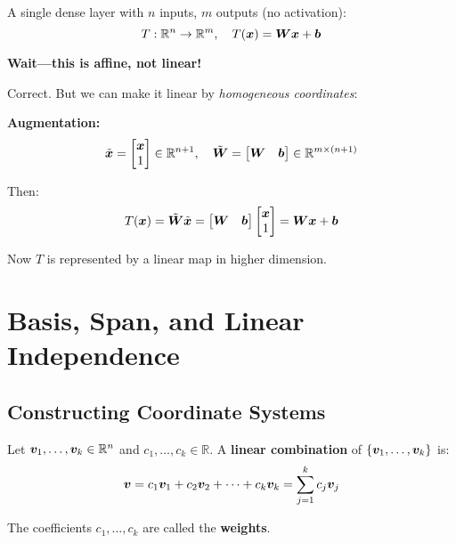 \begin{example}
    A single dense layer with $n$ inputs, $m$ outputs (no activation):
    \[
        T: \mathbb{R}^n \to \mathbb{R}^m, \quad T(\bm{x}) = \bm{W}\bm{x} + \bm{b}
    \]

    \textbf{Wait—this is affine, not linear!}

    Correct. But we can make it linear by \textit{homogeneous coordinates}:

    \textbf{Augmentation:}
    \[
        \tilde{\bm{x}} = \begin{bmatrix} \bm{x} \\ 1 \end{bmatrix} \in \mathbb{R}^{n+1}, \quad
        \tilde{\bm{W}} = \begin{bmatrix} \bm{W} & \bm{b} \end{bmatrix} \in \mathbb{R}^{m \times (n+1)}
    \]

    Then:
    \[
        T(\bm{x}) = \tilde{\bm{W}} \tilde{\bm{x}} = \begin{bmatrix} \bm{W} & \bm{b} \end{bmatrix} \begin{bmatrix} \bm{x} \\ 1 \end{bmatrix} = \bm{W}\bm{x} + \bm{b}
    \]

    Now $T$ is represented by a linear map in higher dimension.
\end{example}

\section{Basis, Span, and Linear Independence}

\subsection{Constructing Coordinate Systems}

\begin{definition}
    \label{def:linear-combination}
    Let $\bm{v}_1, \ldots, \bm{v}_k \in \mathbb{R}^n$ and $c_1, \ldots, c_k \in \mathbb{R}$. A \textbf{linear combination} of $\{\bm{v}_1, \ldots, \bm{v}_k\}$ is:
    \[
        \bm{v} = c_1\bm{v}_1 + c_2\bm{v}_2 + \cdots + c_k\bm{v}_k = \sum_{j=1}^{k} c_j\bm{v}_j
    \]

    The coefficients $c_1, \ldots, c_k$ are called the \textbf{weights}.
\end{definition}

